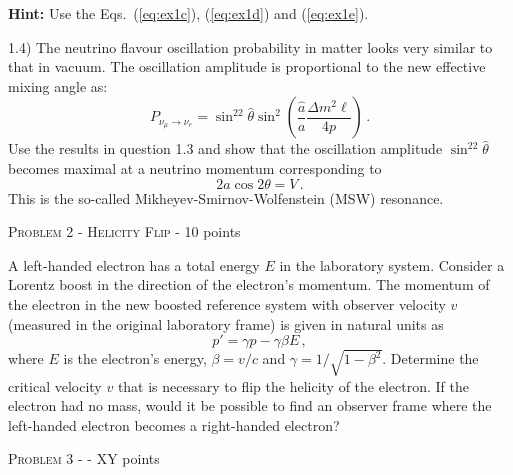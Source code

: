 \documentclass[a4paper,11pt]{report}
\begin{document}
{\bf Hint:} Use the Eqs.~(\ref{eq:ex1c}), (\ref{eq:ex1d}) and (\ref{eq:ex1e}).

1.4) The neutrino flavour oscillation probability in matter looks very similar to that in vacuum. The oscillation amplitude is proportional to the new effective mixing angle as:
\begin{equation}
P_{\nu_\mu\to\nu_e} = \sin^22\hat{\theta}\sin^2\left(\frac{\hat{a}}{a}\frac{\Delta m^2\ell}{4p}\right)\,.
\end{equation}
Use the results in question 1.3 and show that the oscillation amplitude $\sin^22\hat{\theta}$ becomes maximal at a neutrino momentum corresponding to 
\begin{equation}
2a\cos2\theta = V\,.
\end{equation} 
This is the so-called Mikheyev-Smirnov-Wolfenstein (MSW) resonance.
\vspace{1cm}

{\large \textsc{Problem 2 - Helicity Flip} - 10 points}

A left-handed electron has a total energy $E$ in the laboratory system. Consider a Lorentz boost in the direction of the electron's momentum. The momentum of the electron in the new boosted reference system with observer velocity $v$ (measured in the original laboratory frame) is given in natural units as
\begin{equation}
p' = \gamma p - \gamma\beta E\,,
\end{equation}  
where $E$ is the electron's energy, $\beta = v/c$ and $\gamma = 1/\sqrt{1-\beta^2}$. Determine the critical velocity $v$ that is necessary to flip the helicity of the electron. If the electron had no mass, would it be possible to find an observer frame where the left-handed electron becomes a right-handed electron?

\vspace{1cm}

{\large \textsc{Problem 3 - } - XY points}
\end{document}
